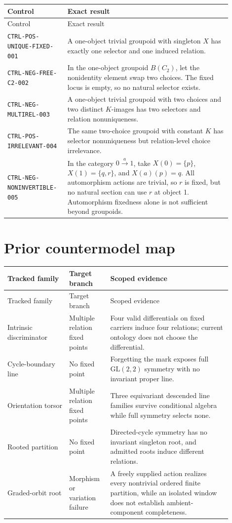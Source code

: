 \documentclass[11pt]{article}
\begin{document}
\begin{longtable}{p{0.22\linewidth}p{0.68\linewidth}}
\toprule
Control & Exact result \\
\midrule
\endfirsthead
\toprule
Control & Exact result \\
\midrule
\endhead
\texttt{CTRL-POS-UNIQUE-FIXED-001} & A one-object trivial groupoid with
singleton \(X\) has exactly one selector and one induced relation. \\
\texttt{CTRL-NEG-FREE-C2-002} & In the one-object groupoid \(B(C_2)\), let
the nonidentity element swap two choices. The fixed locus is empty, so no
natural selector exists. \\
\texttt{CTRL-NEG-MULTIREL-003} & A one-object trivial groupoid with two
choices and two distinct \(K\)-images has two selectors and relation
nonuniqueness. \\
\texttt{CTRL-POS-IRRELEVANT-004} & The same two-choice groupoid with constant
\(K\) has selector nonuniqueness but relation-level choice irrelevance. \\
\texttt{CTRL-NEG-NONINVERTIBLE-005} & In the category
\(0\xrightarrow{a}1\), take \(X(0)=\{p\}\), \(X(1)=\{q,r\}\), and
\(X(a)(p)=q\). All automorphism actions are trivial, so \(r\) is fixed, but
no natural section can use \(r\) at object 1. Automorphism fixedness alone is
not sufficient beyond groupoids. \\
\bottomrule
\end{longtable}

\section{Prior countermodel map}

\begin{longtable}{p{0.25\linewidth}p{0.16\linewidth}p{0.49\linewidth}}
\toprule
Tracked family & Target branch & Scoped evidence \\
\midrule
\endfirsthead
\toprule
Tracked family & Target branch & Scoped evidence \\
\midrule
\endhead
Intrinsic discriminator & Multiple relation fixed points & Four valid
differentials on fixed carriers induce four relations; current ontology does
not choose the differential. \\
Cycle-boundary line & No fixed point & Forgetting the mark exposes full
\(\mathrm{GL}(2,2)\) symmetry with no invariant proper line. \\
Orientation torsor & Multiple relation fixed points & Three equivariant
descended line families survive conditional algebra while full symmetry
selects none. \\
Rooted partition & No fixed point & Directed-cycle symmetry has no invariant
singleton root, and admitted roots induce different relations. \\
Graded-orbit root & Morphism or variation failure & A freely supplied action
realizes every nontrivial ordered finite partition, while an isolated window
does not establish ambient-component completeness. \\
\bottomrule
\end{longtable}
\end{document}
